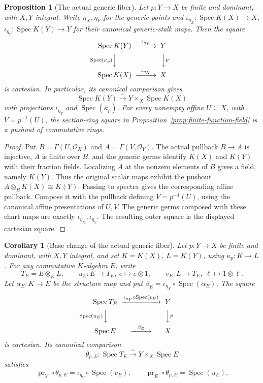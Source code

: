 \documentclass[11pt]{article}
\newtheorem{proposition}[theorem]{Proposition}
\newtheorem{corollary}[theorem]{Corollary}
\theoremstyle{definition}
\theoremstyle{remark}
\DeclareMathOperator{\Spec}{Spec}
\begin{document}
\begin{proposition}[The actual generic fiber]
\label{prop:actual-generic-fiber}
Let \(p:Y\to X\) be finite and dominant, with \(X,Y\) integral.
Write \(\eta_X,\eta_Y\) for the generic points and
\(\iota_{\eta_X}:\Spec K(X)\to X\),
\(\iota_{\eta_Y}:\Spec K(Y)\to Y\) for their canonical generic-stalk maps.
Then the square
\[
\begin{CD}
\Spec K(Y) @>{\iota_{\eta_Y}}>> Y\\
@V{\Spec(\kappa_p)}VV @VV{p}V\\
\Spec K(X) @>{\iota_{\eta_X}}>> X
\end{CD}
\]
is cartesian. In particular, its canonical comparison gives
\[
 \Spec K(Y)\xrightarrow{\sim}Y\times_X\Spec K(X)
\]
with projections \(\iota_{\eta_Y}\) and \(\Spec(\kappa_p)\).
For every nonempty affine \(U\subseteq X\), with
\(V=p^{-1}(U)\), the section-ring square in
Proposition~\ref{prop:finite-function-field} is a pushout of
commutative rings.
\end{proposition}

\begin{proof}
Put \(B=\Gamma(U,\mathcal O_X)\) and
\(A=\Gamma(V,\mathcal O_Y)\). The actual pullback \(B\to A\)
is injective, \(A\) is finite over \(B\), and the generic germs
identify \(K(X)\) and \(K(Y)\) with their fraction fields.
Localizing \(A\) at the nonzero elements of \(B\) gives a field,
namely \(K(Y)\). Thus the original scalar maps exhibit the pushout
\(A\otimes_B K(X)\cong K(Y)\).
Passing to spectra gives the corresponding affine pullback.
Compose it with the pullback defining \(V=p^{-1}(U)\), using
the canonical affine presentations of \(U,V\). The generic germs
composed with these chart maps are exactly
\(\iota_{\eta_X},\iota_{\eta_Y}\).
The resulting outer square is the displayed cartesian square.
\end{proof}

\begin{corollary}[Base change of the actual generic fiber]
\label{cor:generic-fiber-base-change}
Let \(p:Y\to X\) be finite and dominant, with \(X,Y\) integral,
and set \(K=K(X)\), \(L=K(Y)\), using \(\kappa_p:K\to L\).
For any commutative \(K\)-algebra \(E\), write
\[
 T_E=E\otimes_K L,\qquad
 u_E:E\to T_E,\ e\mapsto e\otimes1,\qquad
 v_E:L\to T_E,\ \ell\mapsto1\otimes\ell.
\]
Let \(\alpha_E:K\to E\) be the structure map and put
\(\beta_E=\iota_{\eta_X}\circ\Spec(\alpha_E)\).
The square
\[
\begin{CD}
\Spec T_E @>{\iota_{\eta_Y}\circ\Spec(v_E)}>> Y\\
@V{\Spec(u_E)}VV @VV{p}V\\
\Spec E @>{\beta_E}>> X
\end{CD}
\]
is cartesian. Its canonical comparison
\[
 \theta_{p,E}:\Spec T_E\xrightarrow{\sim}Y\times_X\Spec E
\]
satisfies
\[
 \operatorname{pr}_Y\circ\theta_{p,E}
   =\iota_{\eta_Y}\circ\Spec(v_E),\qquad
 \operatorname{pr}_E\circ\theta_{p,E}=\Spec(u_E).
\]
\end{corollary}
\end{document}
